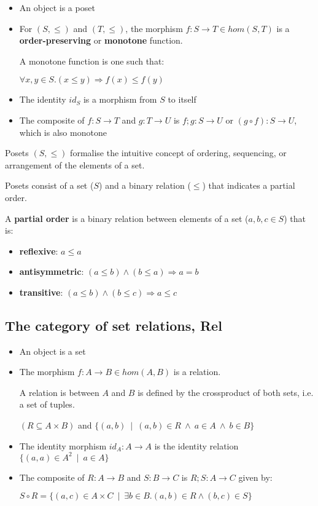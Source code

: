 \documentclass[../main.tex]{subfiles}
\begin{document}
\begin{itemize}
  \item An object is a poset
  \item For $(S,\leq)$ and $(T,\leq)$, the morphism $f : S \rightarrow T  \in hom(S,T)$ is a \textbf{order-preserving} or \textbf{monotone} function. \par
        A monotone function is one such that: \par
        $\forall x,y \in S . (x \leq y) \Rightarrow f(x) \leq f(y)$
  \item The identity $id_S$ is a morphism from $S$ to itself
  \item The composite of $f : S \rightarrow T$ and $g : T \rightarrow U$ is $f ; g : S \rightarrow U$ or $(g \circ f) : S \rightarrow U$, which is also monotone
\end{itemize}

Posets $(S,\leq)$ formalise the intuitive concept of ordering, sequencing, or arrangement of the elements of a set. \par

Posets consist of a set ($S$) and a binary relation ($\leq$) that indicates a partial order. \par

A \textbf{partial order} is a binary relation between elements of a set ($a,b,c \in S$) that is:
\begin{itemize}
  \item \textbf{reflexive}: $a \leq a$
  \item \textbf{antisymmetric}: $(a \leq b) \wedge (b \leq a) \Rightarrow a = b$
  \item \textbf{transitive}: $(a \leq b) \wedge (b \leq c) \Rightarrow a \leq c$
\end{itemize}

\subsection{The category of set relations, Rel}

\begin{itemize}
  \item An object is a set
  \item The morphism $f : A \rightarrow B  \in hom(A,B)$ is a relation. \par
        A relation is between $A$ and $B$ is defined by the crossproduct of both sets, i.e. a set of tuples. \par
        $(R \subseteq A \times B)$ and $\{(a,b) ~\mid~ (a,b) \in R ~\wedge~ a \in A ~\wedge~ b \in B\}$
  \item The identity morphism $id_A : A \rightarrow A$ is the identity relation $\{(a,a) \in A^2 ~\mid~ a \in A\}$
  \item The composite of $R : A \rightarrow B$ and $S : B \rightarrow C$ is $R ; S : A \rightarrow C$ given by: \par
        $S \circ R = \{(a,c) \in A \times C ~\mid~ \exists b \in B . (a,b) \in R \wedge (b,c) \in S\}$
\end{itemize}
\end{document}
